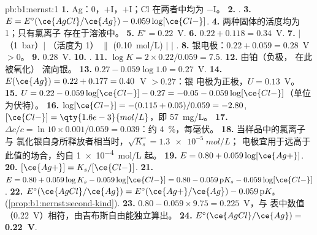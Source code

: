 \begin{solution}{pb:b1:nernst:1}
\textbf{1.} Ag：0，$+$I，$+$I；Cl 在两者中均为 $-$I。
\textbf{2.} .
\textbf{3.} $E = E^\circ(\ce{AgCl}/\ce{Ag}) - 0.059\log[\ce{Cl-}]$.
\textbf{4.} 两种固体的活度均为 1；只有氯离子
存在于溶液中。
\textbf{5.} $E^\circ = 0.22$~V.
\textbf{6.} $0.22 + 0.118 = 0.34$~V.
\textbf{7.}  $|$ （\qty{1}{bar}）$|$ （活度为 1）
$\|$  (\qty{0.10}{mol/L}) $|$  $|$ .
\textbf{8.} 银电极：$0.22 + 0.059 = 0.28$~V $> 0$。
\textbf{9.} $0.28$~V.
\textbf{10.} .
\textbf{11.} $\log K = 2 \times 0.22/0.059 = 7.5$.
\textbf{12.} 由铂（负极， 在此被氧化）
流向银。
\textbf{13.} $0.27 - 0.059\log 1.0 = 0.27$~V.
\textbf{14.} $E(\ce{Ag}) = 0.22 + 0.177 = 0.40$~V $> 0.27$：银
电极为正极，$U = 0.13$~V。
\textbf{15.} $U = 0.22 - 0.059\log[\ce{Cl-}] - 0.27 = -0.05 -
0.059\log[\ce{Cl-}]$（单位为伏特）。
\textbf{16.} $\log[\ce{Cl-}] = -(0.115 + 0.05)/0.059 = -2.80$,
$[\ce{Cl-}] = \qty{1.6e-3}{mol/L}$，即 \qty{57}{mg/L}。
\textbf{17.} $\Delta c/c = \ln 10 \times 0.001/0.059 = 0.039$：约
\qty{4}{\percent}，每毫伏。
\textbf{18.} 当样品中的氯离子与
氯化银自身所释放者相当时，$\sqrt{K_s} = \qty{1.3e-5}{mol/L}$；
电极宜用于远高于此值的场合，约自 \qty{1e-4}{mol/L} 起。
\textbf{19.} $E = 0.80 + 0.059\log[\ce{Ag+}]$.
\textbf{20.} $[\ce{Ag+}] = K_s/[\ce{Cl-}]$.
\textbf{21.} $E = 0.80 + 0.059\log K_s - 0.059\log[\ce{Cl-}] = 0.80 -
0.059\,\mathrm{p}K_s - 0.059\log[\ce{Cl-}]$.
\textbf{22.} $E^\circ(\ce{AgCl}/\ce{Ag}) = E^\circ(\ce{Ag+}/\ce{Ag}) -
0.059\,\mathrm{p}K_s$ (\cref{prop:b1:nernst:second-kind}).
\textbf{23.} $0.80 - 0.059 \times 9.75 = 0.225$~V，与
表中数值（0.22~V）相符，由吉布斯自由能独立算出。
\textbf{24.} $E^\circ(\ce{AgCl}/\ce{Ag}) = $ \textbf{0.22~V}.
\end{solution}
